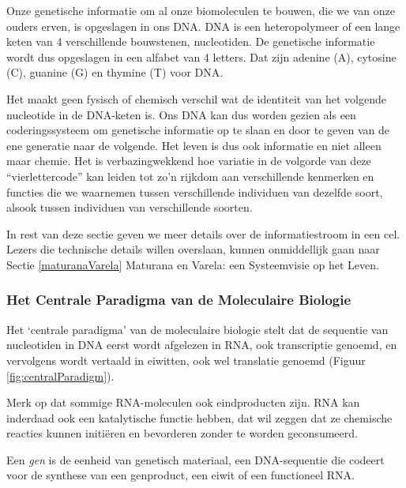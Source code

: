 \documentclass[
  11pt,
]{book}
\begin{document}
Onze genetische informatie om al onze biomoleculen te bouwen, die we van onze ouders erven, is opgeslagen in ons DNA. DNA is een heteropolymeer of een lange keten van 4 verschillende bouwstenen, nucleotiden. De genetische informatie wordt dus opgeslagen in een alfabet van 4 letters. Dat zijn adenine (A), cytosine (C), guanine (G) en thymine (T) voor DNA.

Het maakt geen fysisch of chemisch verschil wat de identiteit van het volgende nucleotide in de DNA-keten is. Ons DNA kan dus worden gezien als een coderingssysteem om genetische informatie op te slaan en door te geven van de ene generatie naar de volgende. Het leven is dus ook informatie en niet alleen maar chemie. Het is verbazingwekkend hoe variatie in de volgorde van deze ``vierlettercode'' kan leiden tot zo'n rijkdom aan verschillende kenmerken en functies die we waarnemen tussen verschillende individuen van dezelfde soort, alsook tussen individuen van verschillende soorten.

In rest van deze sectie geven we meer details over de informatiestroom in een cel. Lezers die technische details willen overslaan, kunnen onmiddellijk gaan naar Sectie \ref{maturanaVarela} Maturana en Varela: een Systeemvisie op het Leven.

\hypertarget{het-centrale-paradigma-van-de-moleculaire-biologie}{%
\subsubsection{Het Centrale Paradigma van de Moleculaire Biologie}\label{het-centrale-paradigma-van-de-moleculaire-biologie}}

Het `centrale paradigma' van de moleculaire biologie stelt dat de sequentie van nucleotiden in DNA eerst wordt afgelezen in RNA, ook transcriptie genoemd, en vervolgens wordt vertaald in eiwitten, ook wel translatie genoemd (Figuur \ref{fig:centralParadigm}).

Merk op dat sommige RNA-moleculen ook eindproducten zijn. RNA kan inderdaad ook een katalytische functie hebben, dat wil zeggen dat ze chemische reacties kunnen initiëren en bevorderen zonder te worden geconsumeerd.

Een \emph{gen} is de eenheid van genetisch materiaal, een DNA-sequentie die codeert voor de synthese van een genproduct, een eiwit of een functioneel RNA.
\end{document}
